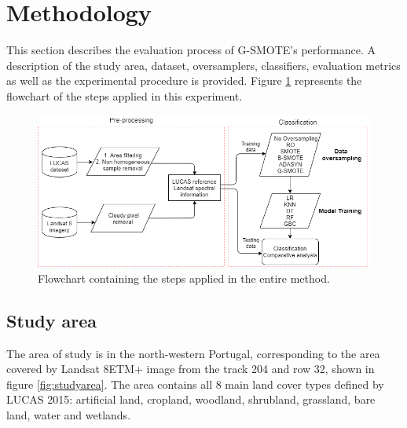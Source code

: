 \documentclass[remotesensing,article,submit,moreauthors,pdftex]{Definitions/mdpi}
\begin{document}
\section{Methodology}

This section describes the evaluation process of G-SMOTE's performance. A
description of the study area, dataset, oversamplers, classifiers, evaluation
metrics as well as the experimental procedure is provided. Figure
\ref{fig:flowchart} represents the flowchart of the steps applied in this
experiment.

\begin{figure}[H]
	\centering
	\includegraphics[width=1\linewidth]{../analysis/g_smote_flow_chart}
	\caption{Flowchart containing the steps applied in the entire method.}
	\label{fig:flowchart}
\end{figure}

\subsection{Study area}

The area of study is in the north-western Portugal, corresponding to the area
covered by Landsat 8ETM+ image from the track 204 and row 32, shown in figure
\ref{fig:studyarea}. The area contains all 8 main land cover types defined by
LUCAS 2015: artificial land, cropland, woodland, shrubland, grassland, bare 
land, water and wetlands.
\end{document}
